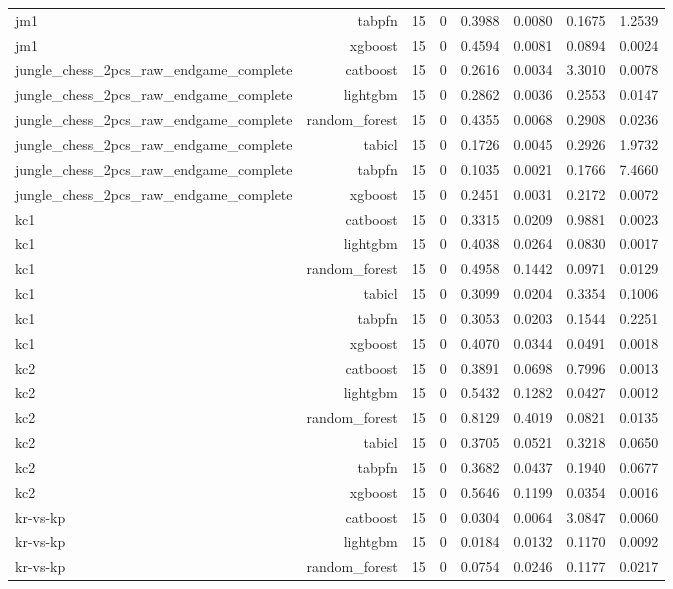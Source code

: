 \begin{table}[htbp]
\begin{tabular}{lrrrrrrr}
jm1 & tabpfn & 15 & 0 & 0.3988 & 0.0080 & 0.1675 & 1.2539 \\
jm1 & xgboost & 15 & 0 & 0.4594 & 0.0081 & 0.0894 & 0.0024 \\
jungle\_chess\_2pcs\_raw\_endgame\_complete & catboost & 15 & 0 & 0.2616 & 0.0034 & 3.3010 & 0.0078 \\
jungle\_chess\_2pcs\_raw\_endgame\_complete & lightgbm & 15 & 0 & 0.2862 & 0.0036 & 0.2553 & 0.0147 \\
jungle\_chess\_2pcs\_raw\_endgame\_complete & random\_forest & 15 & 0 & 0.4355 & 0.0068 & 0.2908 & 0.0236 \\
jungle\_chess\_2pcs\_raw\_endgame\_complete & tabicl & 15 & 0 & 0.1726 & 0.0045 & 0.2926 & 1.9732 \\
jungle\_chess\_2pcs\_raw\_endgame\_complete & tabpfn & 15 & 0 & 0.1035 & 0.0021 & 0.1766 & 7.4660 \\
jungle\_chess\_2pcs\_raw\_endgame\_complete & xgboost & 15 & 0 & 0.2451 & 0.0031 & 0.2172 & 0.0072 \\
kc1 & catboost & 15 & 0 & 0.3315 & 0.0209 & 0.9881 & 0.0023 \\
kc1 & lightgbm & 15 & 0 & 0.4038 & 0.0264 & 0.0830 & 0.0017 \\
kc1 & random\_forest & 15 & 0 & 0.4958 & 0.1442 & 0.0971 & 0.0129 \\
kc1 & tabicl & 15 & 0 & 0.3099 & 0.0204 & 0.3354 & 0.1006 \\
kc1 & tabpfn & 15 & 0 & 0.3053 & 0.0203 & 0.1544 & 0.2251 \\
kc1 & xgboost & 15 & 0 & 0.4070 & 0.0344 & 0.0491 & 0.0018 \\
kc2 & catboost & 15 & 0 & 0.3891 & 0.0698 & 0.7996 & 0.0013 \\
kc2 & lightgbm & 15 & 0 & 0.5432 & 0.1282 & 0.0427 & 0.0012 \\
kc2 & random\_forest & 15 & 0 & 0.8129 & 0.4019 & 0.0821 & 0.0135 \\
kc2 & tabicl & 15 & 0 & 0.3705 & 0.0521 & 0.3218 & 0.0650 \\
kc2 & tabpfn & 15 & 0 & 0.3682 & 0.0437 & 0.1940 & 0.0677 \\
kc2 & xgboost & 15 & 0 & 0.5646 & 0.1199 & 0.0354 & 0.0016 \\
kr-vs-kp & catboost & 15 & 0 & 0.0304 & 0.0064 & 3.0847 & 0.0060 \\
kr-vs-kp & lightgbm & 15 & 0 & 0.0184 & 0.0132 & 0.1170 & 0.0092 \\
kr-vs-kp & random\_forest & 15 & 0 & 0.0754 & 0.0246 & 0.1177 & 0.0217 \\

\end{tabular}
\end{table}
